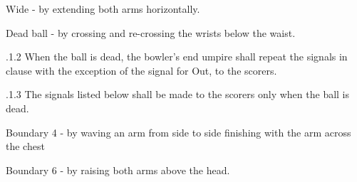 \documentclass[12pt]{article}
\begin{document}
\vspace{\baselineskip}
\begin{adjustwidth}{1.0in}{0.0in}
{\fontsize{9pt}{10.8pt}\selectfont Wide - by extending both arms horizontally.\par}\par

\end{adjustwidth}


\vspace{\baselineskip}
\begin{adjustwidth}{1.0in}{0.0in}
{\fontsize{9pt}{10.8pt}\selectfont Dead ball - by crossing and re-crossing the wrists below the waist.\par}\par

\end{adjustwidth}


\vspace{\baselineskip}
\begin{adjustwidth}{1.18in}{0.1in}
{\fontsize{9pt}{10.8pt}.1.2 \tabto{1.17in} When the ball is dead, the bowler’s end umpire shall repeat the signals in clause with the exception of the signal for Out, to the scorers.\par}\par

\end{adjustwidth}


\vspace{\baselineskip}
\begin{adjustwidth}{0.49in}{0.0in}
{\fontsize{9pt}{10.8pt}.1.3 \tabto{1.17in} The signals listed below shall be made to the scorers only when the ball is dead.\par}\par

\end{adjustwidth}


\vspace{\baselineskip}
\begin{adjustwidth}{1.0in}{0.0in}
{\fontsize{9pt}{10.8pt}\selectfont Boundary 4 - by waving an arm from side to side finishing with the arm across the chest\par}\par

\end{adjustwidth}


\vspace{\baselineskip}
\begin{adjustwidth}{1.0in}{0.0in}
{\fontsize{9pt}{10.8pt}\selectfont Boundary 6 - by raising both arms above the head.\par}\par

\end{adjustwidth}
\end{document}
